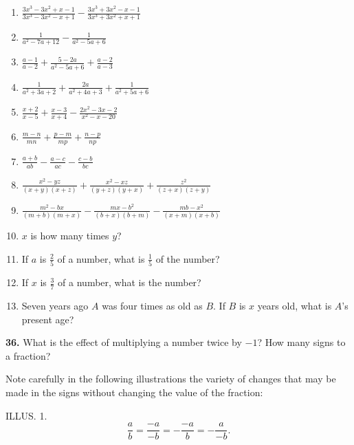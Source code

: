 \documentclass{book}
\begin{document}
\begin{enumerate}
\item $\displaystyle \frac{3x^3 - 3x^2 + x - 1}{3x^3 - 3x^2 - x +
1} - \frac{3x^3 + 3x^2 - x - 1}{3x^3 + 3x^2 + x + 1}$

\item $\displaystyle \frac{1}{a^2 - 7a + 12} - \frac{1}{a^2 - 5a +
6}$

\item $\displaystyle \frac{a-1}{a-2} + \frac{5 - 2a}{a^2 - 5a + 6}
+ \frac{a-2}{a-3}$

\item $\displaystyle \frac{1}{a^2 + 3a + 2} + \frac{2a}{a^2 + 4a +
3} + \frac{1}{a^2 + 5a + 6}$

\item $\displaystyle \frac{x+2}{x-5} + \frac{x-3}{x+4} -
\frac{2x^2 - 3x - 2}{x^2 - x - 20}$

\item $\displaystyle \frac{m - n}{mn} + \frac{p - m}{mp} +
\frac{n-p}{np}$

\item $\displaystyle \frac{a+b}{ab} - \frac{a-c}{ac} -
\frac{c-b}{bc}$

\item $\displaystyle \frac{x^2 - yz}{(x+y)(x+z)} + \frac{x^2 -
xz}{(y+z)(y+x)} + \frac{z^2}{(z+x)(z+y)}$

\item $\displaystyle \frac{m^2 - bx}{(m+b)(m+x)} - \frac{mx -
b^2}{(b+x)(b+m)} - \frac{mb - x^2}{(x+m)(x+b)}$

\item $x$ is how many times $y$?

\item If $a$ is $\frac{2}{5}$ of a number, what is $\frac{1}{5}$
of the number?

\item If $x$ is $\frac{3}{7}$ of a number, what is the number?

\item Seven years ago $A$ was four times as old as $B$.  If $B$ is
$x$ years old, what is $A$'s present age?
\end{enumerate}

\textbf{ 36.} What is the effect of multiplying a number twice by
$-1$? How many signs to a fraction?

Note carefully in the following illustrations the variety of
changes that may be made in the signs without changing the value
of the fraction:

ILLUS. 1.
\[
\frac{a}{b}=\frac{-a}{-b}=-\frac{-a}{b}=-\frac{a}{-b}.
\]
\end{document}
